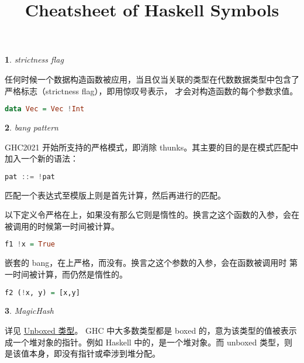 \documentclass[UTF8]{ctexart}
\title{Cheatsheet of Haskell Symbols}
\author{}
\date{}
\theoremstyle{sybs}
\newtheorem{syb}{}
\begin{document}
\maketitle

\begin{syb}
  \acode{!} strictness flag
\end{syb}

任何时候一个数据构造函数被应用，当且仅当关联的类型在代数数据类型中包含了严格标志（strictness flag），即用惊叹号\acode{!}表示，
才会对构造函数的每个参数求值。

\begin{lstlisting}[language=Haskell]
  data Vec = Vec !Int
\end{lstlisting}

\begin{syb}
  \acode{!} bang pattern
\end{syb}

GHC2021 开始所支持的严格模式，即消除 thunks。其主要的目的是在模式匹配中加入一个新的语法：

\begin{lstlisting}[language=Haskell]
  pat ::= !pat
\end{lstlisting}

匹配一个表达式至模版上则是首先计算，然后再进行的匹配。

以下定义令严格在上，如果没有\acode{!}那么它则是惰性的。换言之这个函数的入参，会在
被调用的时候第一时间被计算。

\begin{lstlisting}[language=Haskell]
  f1 !x = True
\end{lstlisting}

嵌套的 bang，在上严格，而没有。换言之这个参数的入参，会在函数被调用时
第一时间被计算，而仍然是惰性的。

\begin{lstlisting}[language=Haskell]
  f2 (!x, y) = [x,y]
\end{lstlisting}

\begin{syb}
  \acode{\#} MagicHash
\end{syb}

详见
\href{https://downloads.haskell.org/ghc/latest/docs/users_guide/exts/primitives.html#glasgow-unboxed}{Unboxed 类型}。
GHC 中大多数类型都是 boxed 的，意为该类型的值被表示成一个堆对象的指针。例如 Haskell 中的，是一个堆对象。而 unboxed
类型，则是该值本身，即没有指针或牵涉到堆分配。
\end{document}
